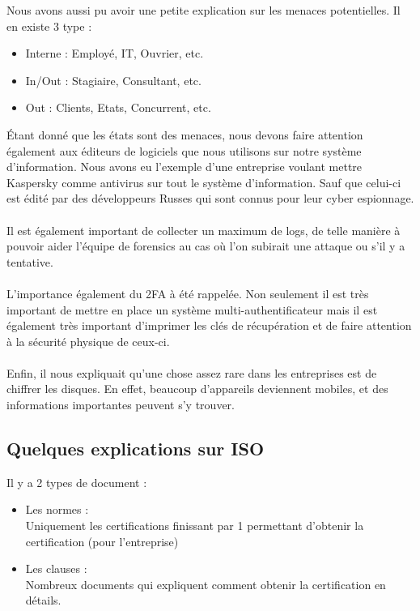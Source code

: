 \documentclass[a4paper]{article}
\begin{document}
Nous avons aussi pu avoir une petite explication sur les menaces potentielles. Il en existe 3 type : 
\begin{itemize}
    \item Interne : Employé, IT, Ouvrier, etc.
    \item In/Out : Stagiaire, Consultant, etc.
    \item Out : Clients, Etats, Concurrent, etc.
\end{itemize}
Étant donné que les états sont des menaces, nous devons faire attention également aux éditeurs de logiciels que nous utilisons sur notre système d'information. Nous avons eu l'exemple d'une entreprise voulant mettre Kaspersky comme antivirus sur tout le système d'information. Sauf que celui-ci est édité par des développeurs Russes qui sont connus pour leur cyber espionnage.\\\\
Il est également important de collecter un maximum de logs, de telle manière à pouvoir aider l'équipe de forensics au cas où l'on subirait une attaque ou s'il y a tentative.\\\\
L'importance également du 2FA à été rappelée. Non seulement il est très important de mettre en place un système multi-authentificateur mais il est également très important d'imprimer les clés de récupération et de faire attention à la sécurité physique de ceux-ci.\\\\
Enfin, il nous expliquait qu'une chose assez rare dans les entreprises est de chiffrer les disques. En effet, beaucoup d'appareils deviennent mobiles, et des informations importantes peuvent s'y trouver.

\subsection{Quelques explications sur ISO}
Il y a 2 types de document : 
\begin{itemize}
    \item Les normes :\\
    Uniquement les certifications finissant par 1 permettant d'obtenir la certification (pour l'entreprise)\\
    \item Les clauses :\\
    Nombreux documents qui expliquent comment obtenir la certification en détails.\\
\end{itemize}
\end{document}
